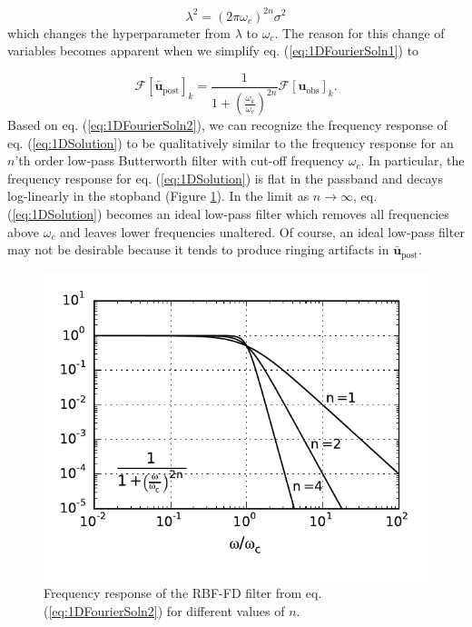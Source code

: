 \documentclass[10pt,a4paper]{article}
\begin{document}
\begin{equation}\label{eq:VariableChange}
\lambda^2 = (2\pi\omega_c)^{2n}\sigma^2
\end{equation}
which changes the hyperparameter from $\lambda$ to $\omega_c$.  The reason for this change of variables becomes apparent when we simplify eq. (\ref{eq:1DFourierSoln1}) to

\begin{equation}\label{eq:1DFourierSoln2}
\mathcal{F}\left[\mathbf{\bar{u}}_\mathrm{post}\right]_k = \frac{1}
                                {1 + \left(\frac{\omega_k}{\omega_c}\right)^{2n}}
                                \mathcal{F}\left[\mathbf{u}_\mathrm{obs}\right]_k.        
\end{equation}
Based on eq. (\ref{eq:1DFourierSoln2}), we can recognize the frequency response of eq. (\ref{eq:1DSolution}) to be qualitatively similar to the frequency response for an $n$'th order low-pass Butterworth filter with cut-off frequency $\omega_c$.  In particular, the frequency response for eq. (\ref{eq:1DSolution}) is flat in the passband and decays log-linearly in the stopband (Figure \ref{fig:FrequencyResponse}).  In the limit as $n\to \infty$, eq. (\ref{eq:1DSolution}) becomes an ideal low-pass filter which removes all frequencies above $\omega_c$ and leaves lower frequencies unaltered.  Of course, an ideal low-pass filter may not be desirable because it tends to produce ringing artifacts in $\mathbf{\bar{u}}_\mathrm{post}$. 

\begin{figure}
\includegraphics[scale=1.0]{figures/figure1}
\caption{Frequency response of the RBF-FD filter from eq. (\ref{eq:1DFourierSoln2}) for different values of $n$.}   
\label{fig:FrequencyResponse}
\end{figure}
\end{document}
